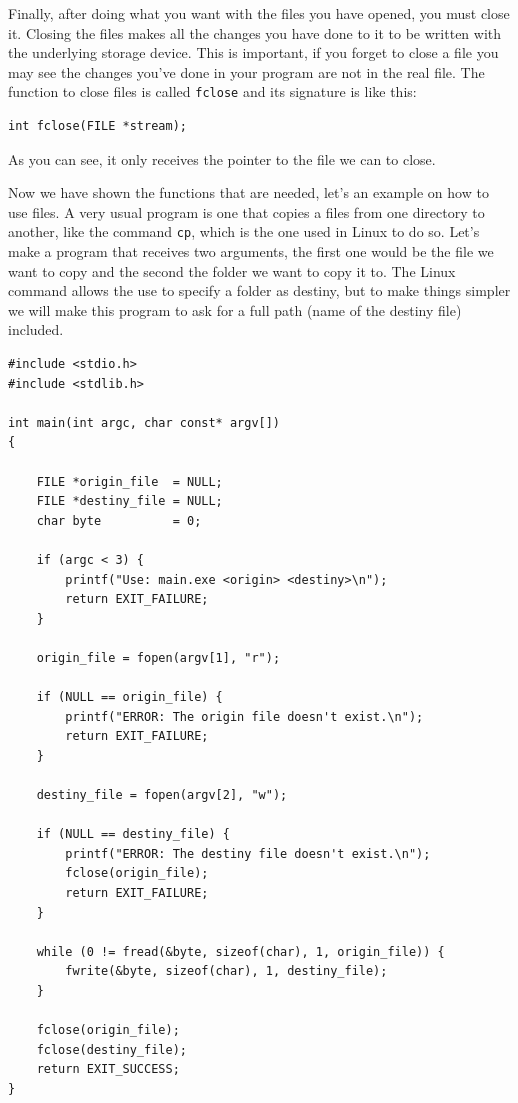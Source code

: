 \documentclass[a4paper]{article}
\begin{document}
Finally, after doing what you want with the files you have opened, you must
close it. Closing the files makes all the changes you have done to it to be
written with the underlying storage device. This is important, if you forget to
close a file you may see the changes you've done in your program are not
in the real file. The function to close files is called \verb!fclose! and its
signature is like this:

\noindent
\begin{minipage}[H]{\linewidth}
\mbox{}
\begin{lstlisting}[style=C,
caption={\texttt{fclose} signature},
label={lst:fcloseSignature}]
int fclose(FILE *stream);
\end{lstlisting}
\end{minipage}
As you can see, it only receives the pointer to the file we can to close.

Now we have shown the functions that are needed, let's an example on how to use
files. A very usual program is one that copies a files from one directory to
another, like the command \verb!cp!, which is the one used in Linux to do so.
Let's make a program that receives two arguments, the first one would be the
file we want to copy and the second the folder we want to copy it to. The Linux
command allows the use to specify a folder as destiny, but to make things
simpler we will make this program to ask for a full path (name of the destiny
file) included.

\noindent
\begin{minipage}[H]{\linewidth}
\mbox{}
\begin{lstlisting}[style=C,
caption={Example of basic file management},
label={lst:fileBasic}]
#include <stdio.h>
#include <stdlib.h>

int main(int argc, char const* argv[])
{

    FILE *origin_file  = NULL;
    FILE *destiny_file = NULL;
    char byte          = 0;

    if (argc < 3) {
        printf("Use: main.exe <origin> <destiny>\n");
        return EXIT_FAILURE;
    }

    origin_file = fopen(argv[1], "r");

    if (NULL == origin_file) {
        printf("ERROR: The origin file doesn't exist.\n");
        return EXIT_FAILURE;
    }

    destiny_file = fopen(argv[2], "w");

    if (NULL == destiny_file) {
        printf("ERROR: The destiny file doesn't exist.\n");
        fclose(origin_file);
        return EXIT_FAILURE;
    }

    while (0 != fread(&byte, sizeof(char), 1, origin_file)) {
        fwrite(&byte, sizeof(char), 1, destiny_file);
    }

    fclose(origin_file);
    fclose(destiny_file);
    return EXIT_SUCCESS;
}

\end{lstlisting}
\end{minipage}
\end{document}
